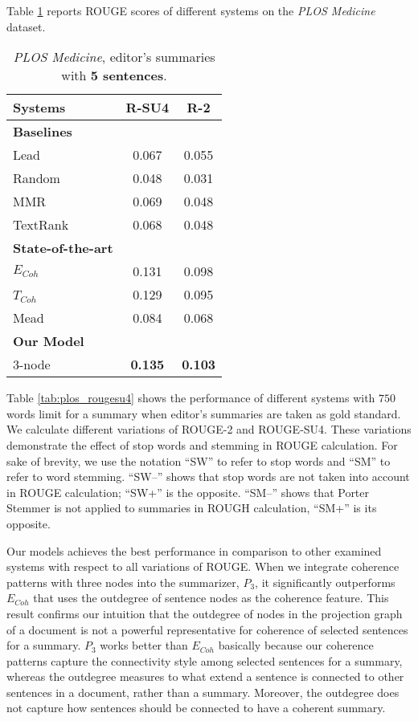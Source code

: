 Table \ref{table:plos_5len_editor} reports ROUGE scores of different systems on the \emph{PLOS Medicine} dataset. 

\begin{table}[!ht]
	\begin{center}
		\begin{tabular}{lcc}
		\hline
		Systems & R-SU4 & R-2\\
		\hline
		\textbf{Baselines}&  & \\
		Lead & 0.067 &  0.055  \\
		Random &  0.048  & 0.031  \\
		MMR & 0.069 &  0.048  \\
		TextRank & 0.068  & 0.048  \\
		\textbf{State-of-the-art}&  & \\
		$E_{Coh}$ & 0.131& 0.098 \\
		$T_{Coh}$\ & 0.129 & 0.095  \\
		Mead & 0.084 & 0.068 \\
		\textbf{Our Model} & & \\
		3-node & \textbf{0.135} & \textbf{0.103} \\
		\hline
		\end{tabular}
	\end{center}
	\caption{\emph{PLOS Medicine}, editor's summaries with \textbf{5 sentences}.}
	\label{table:plos_5len_editor}
\end{table}

Table \ref{tab:plos_rougesu4} shows the performance of different systems with $750$ words limit for a summary when editor's summaries are taken as gold standard. 
We calculate different variations of ROUGE-2 and ROUGE-SU4. 
These variations demonstrate the effect of stop words and stemming in ROUGE calculation.
For sake of brevity, we use the notation ``SW'' to refer to stop words and ``SM'' to refer to word stemming.  
``SW--'' shows that stop words are not taken into account in ROUGE calculation; ``SW+'' is the opposite. 
``SM--'' shows that Porter Stemmer is not applied to summaries in ROUGH calculation, ``SM+'' is its opposite. 
 
Our models achieves the best performance in comparison to other examined systems with respect to all variations of ROUGE. 
When we integrate coherence patterns with three nodes into the summarizer, $P_3$, it significantly outperforms $E_{Coh}$ that uses the outdegree of sentence nodes as the coherence feature. 
This result confirms our intuition that the outdegree of nodes in the projection graph of a document is not a powerful representative for coherence of selected sentences for a summary. 
$P_3$ works better than $E_{Coh}$ basically because our coherence patterns capture the connectivity style among selected sentences for a summary, whereas
the outdegree measures to what extend a sentence is connected to other sentences  in a document, rather than a summary. 
Moreover, the outdegree does not capture how sentences should be connected to have a coherent summary. 

